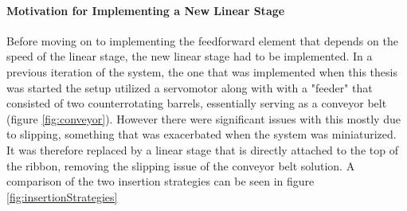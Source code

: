 \paragraph*{Motivation for Implementing a New Linear Stage}
Before moving on to implementing the feedforward element that depends on the speed of the linear stage, the new linear stage had to be implemented. In a previous iteration of the system, the one that was implemented when this thesis was started the setup utilized a servomotor along with with a "feeder" that consisted of two counterrotating barrels, essentially serving as a conveyor belt (figure \ref{fig:conveyor}). However there were significant issues with this mostly due to slipping, something that was exacerbated when the system was miniaturized. It was therefore replaced by a linear stage that is directly attached to the top of the ribbon, removing the slipping issue of the conveyor belt solution. A comparison of the two insertion strategies can be seen in figure \ref{fig:insertionStrategies}

